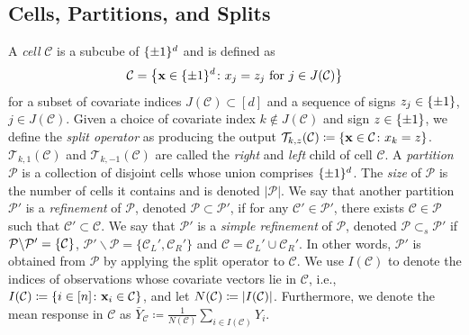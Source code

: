 \documentclass[11pt]{article}
\newcommand{\bx}{\mathbf{x}}
\DeclarePairedDelimiter{\braces}{\lbrace}{\rbrace}
\DeclarePairedDelimiter{\abs}{|}{|}
\newcommand{\cell}{\mathcal{C}}
\newcommand{\partition}{\mathcal{P}}
\newcommand{\binspace}{\braces{\pm 1}^\nfeats}
\newcommand{\nfeats}{d}
\newcommand{\nsamples}{n}
\newcommand{\data}[1][n]{\mathcal{D}_{#1}}
\newcommand{\featindices}{J}
\newcommand{\splitoperator}{\mathcal{T}}
\newcommand{\cellsampindices}{I}
\begin{document}
\subsection{Cells, Partitions, and Splits}
A \emph{cell} $\cell$ is a subcube of $\binspace$ and is defined as 
\begin{equation}
    \label{eq:cell_def}
    \cell = \braces*{\bx \in \binspace \colon x_j = z_j~\text{for}~j \in \featindices(\cell)}
\end{equation}
for a subset of covariate indices $\featindices(\cell) \subset [\nfeats]$ and a sequence of signs $z_j \in \braces*{\pm 1}$, $j \in \featindices(\cell)$.
Given a choice of covariate index $k \notin \featindices(\cell)$ and sign $z \in \braces*{\pm 1}$, we define the \emph{split operator} as producing the output $\splitoperator_{k,z}(\cell) \coloneqq \braces*{\bx \in \cell \colon x_k = z}$.
$\splitoperator_{k,1}(\cell)$ and $\splitoperator_{k,-1}(\cell)$ are called the \emph{right} and \emph{left} child of cell $\cell$.  
A \emph{partition} $\partition$ is a collection of disjoint cells whose union comprises $\binspace$.
The \emph{size} of $\partition$ is the number of cells it contains and is denoted $|\partition|$.
We say that another partition $\partition'$ is a \emph{refinement} of $\partition$, denoted $\partition \subset \partition'$, if for any $\cell' \in \partition'$, there exists $\cell \in \partition$ such that $\cell' \subset \cell$.
We say that $\partition'$ is a \emph{simple refinement} of $\partition$, denoted $\partition \subset_s \partition'$ if $\partition\backslash\partition' = \braces{\cell}$, $\partition'\backslash \partition = \lbrace \cell_L',\cell_R'\rbrace$ and $\cell = \cell_L' \cup \cell_R'$.
In other words, $\partition'$ is obtained from $\partition$ by applying the split operator to $\cell$.
We use $\cellsampindices(\cell)$ to denote the indices of observations whose covariate vectors lie in $\cell$, i.e., $\cellsampindices(\cell) \coloneqq \braces*{i \in [\nsamples] \colon \bx_i \in \cell}$, and let $N(\cell) \coloneqq \abs*{\cellsampindices(\cell)}$.
Furthermore, we denote the mean response in $\cell$ as $\bar Y_{\cell} \coloneqq \frac{1}{N(\cell)} \sum_{i \in \cellsampindices(\cell)} Y_i$.
\end{document}
